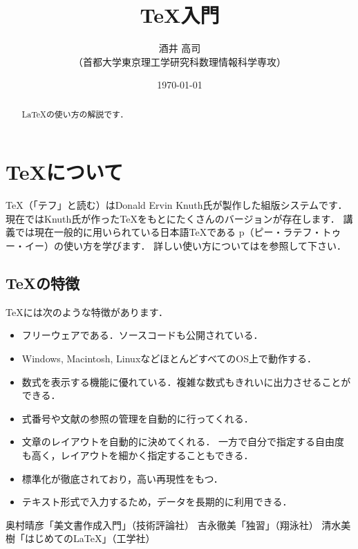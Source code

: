 \documentclass[11pt]{jarticle} %
\title{\TeX 入門} %
\author{酒井 高司\\（首都大学東京理工学研究科数理情報科学専攻）} %
\date{\today} %
\begin{document}
\maketitle %
\begin{abstract} %
\LaTeX の使い方の解説です．
\end{abstract}

\tableofcontents %

\section{\TeX について} %

\TeX （「テフ」と読む）はDonald Ervin Knuth氏が製作した組版システムです．
現在ではKnuth氏が作った\TeX をもとにたくさんのバージョンが存在します．
講義では現在一般的に用いられている日本語\TeX である
p\LaTeXe （ピー・ラテフ・トゥー・イー）の使い方を学びます．
詳しい使い方については\cite{Okumura,Yoshinaga,Shimizu}を参照して下さい．

\subsection{\TeX の特徴} %

TeXには次のような特徴があります．
\begin{itemize}
\item フリーウェアである．ソースコードも公開されている．
\item Windows, Macintosh, LinuxなどほとんどすべてのOS上で動作する．
\item 数式を表示する機能に優れている．複雑な数式もきれいに出力させることができる．
\item 式番号や文献の参照の管理を自動的に行ってくれる．
\item 文章のレイアウトを自動的に決めてくれる．
一方で自分で指定する自由度も高く，レイアウトを細かく指定することもできる．
\item 標準化が徹底されており，高い再現性をもつ．
\item テキスト形式で入力するため，データを長期的に利用できる．
\end{itemize}

\begin{thebibliography}{9} %
 奥村晴彦「\LaTeXe 美文書作成入門」（技術評論社）
 吉永徹美「独習\LaTeXe 」（翔泳社）
 清水美樹「はじめての\LaTeX 」（工学社）
\end{thebibliography}
\end{document}
